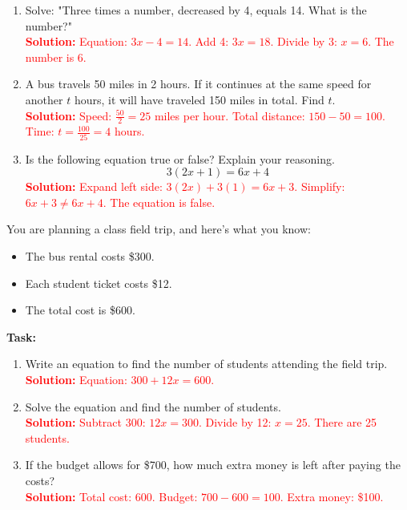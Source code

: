 \documentclass[12pt]{article}
\begin{document}
\begin{tcolorbox}[colframe=black!60, colback=white, 
coltitle=black, colbacktitle=black!15, fonttitle=\bfseries\Large, 
title=Problems, halign title=center, left=10pt, right=10pt, top=10pt, bottom=60pt]
\begin{enumerate}[start=9, itemsep=2em]
    \item Solve: "Three times a number, decreased by 4, equals 14. What is the number?"\\
    \textcolor{red}{\textbf{Solution:} Equation: \( 3x - 4 = 14 \). Add 4: \( 3x = 18 \). Divide by 3: \( x = 6 \). The number is \(6\).}

    \item A bus travels 50 miles in 2 hours. If it continues at the same speed for another \(t\) hours, it will have traveled 150 miles in total. Find \(t\).\\
    \textcolor{red}{\textbf{Solution:} Speed: \( \frac{50}{2} = 25 \) miles per hour. Total distance: \( 150 - 50 = 100 \). Time: \( t = \frac{100}{25} = 4 \) hours.}

    \item Is the following equation true or false? Explain your reasoning.
    \[
    3(2x + 1) = 6x + 4
    \]
    \textcolor{red}{\textbf{Solution:} Expand left side: \( 3(2x) + 3(1) = 6x + 3 \). Simplify: \( 6x + 3 \neq 6x + 4 \). The equation is false.}
\end{enumerate}
\end{tcolorbox}

\begin{tcolorbox}[colframe=black!60, colback=white, 
coltitle=black, colbacktitle=black!15, fonttitle=\bfseries\Large, 
title=Performance Task: Solving a Budget Problem, halign title=center, left=10pt, right=10pt, top=10pt, bottom=50pt]
You are planning a class field trip, and here’s what you know:
\begin{itemize}
    \item The bus rental costs \$300.
    \item Each student ticket costs \$12.
    \item The total cost is \$600.
\end{itemize}
\textbf{Task:}
\begin{enumerate}[itemsep=3em]
    \item Write an equation to find the number of students attending the field trip.\\
    \textcolor{red}{\textbf{Solution:} Equation: \( 300 + 12x = 600 \).}

    \item Solve the equation and find the number of students.\\
    \textcolor{red}{\textbf{Solution:} Subtract 300: \( 12x = 300 \). Divide by 12: \( x = 25 \). There are 25 students.}

    \item If the budget allows for \$700, how much extra money is left after paying the costs?\\
    \textcolor{red}{\textbf{Solution:} Total cost: \( 600 \). Budget: \( 700 - 600 = 100 \). Extra money: \$100.}
\end{enumerate}
\end{tcolorbox}
\end{document}
